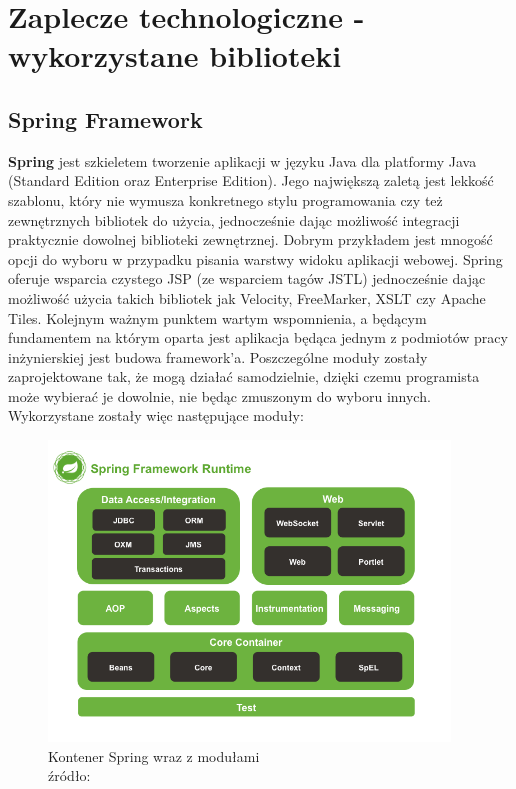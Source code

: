 \chapter{Zaplecze technologiczne - wykorzystane biblioteki}
\label{chapter:libs}

\section{Spring Framework}
	\textbf{Spring} jest szkieletem tworzenie aplikacji w języku Java dla platformy Java (Standard Edition oraz Enterprise Edition). Jego największą zaletą jest lekkość szablonu, który nie wymusza konkretnego stylu programowania czy też zewnętrznych bibliotek do użycia, jednocześnie dając możliwość integracji praktycznie dowolnej biblioteki zewnętrznej. Dobrym przykładem jest mnogość opcji do wyboru w przypadku pisania warstwy widoku aplikacji webowej. Spring oferuje wsparcia czystego JSP (ze wsparciem tagów JSTL) jednocześnie dając możliwość użycia takich bibliotek jak Velocity, FreeMarker, XSLT czy Apache Tiles. 
	Kolejnym ważnym punktem wartym wspomnienia, a będącym fundamentem na którym oparta jest aplikacja będąca jednym z podmiotów pracy inżynierskiej jest budowa framework'a. Poszczególne moduły zostały zaprojektowane tak, że mogą działać samodzielnie, dzięki czemu programista może wybierać je dowolnie, nie będąc zmuszonym do wyboru innych. Wykorzystane zostały więc następujące moduły:
	
	\begin{figure}[H]
		\centering
		\includegraphics[width=0.95\textwidth]{images/spring-overview}
		\caption[Kontener Spring]{
			Kontener Spring wraz z modułami\\ 
			źródło: \cite{spring_documentation_reference}
		}
		\label{c3:information_level_figure}
	\end{figure}
	
